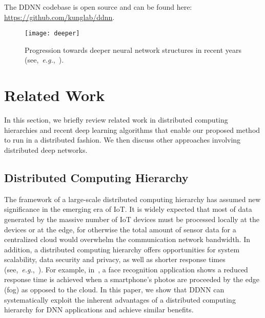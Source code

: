 \documentclass[10pt, conference, compsocconf]{IEEEtran}
\newcommand{\eg}{\emph{e.g.}}
\begin{document}
The DDNN codebase is open source and can be found here: \url{https://github.com/kunglab/ddnn}.


\begin{figure}
    \centering
    \texttt{[image: deeper]}
    \caption{Progression towards deeper neural network structures in recent years (see,~\eg,~\cite{lecun1998gradient,krizhevsky2012imagenet,simonyan2014very,szegedy2015going,he2015deep}).}
    \label{fig:deeper}
\end{figure}
 

\section{Related Work}
In this section, we briefly review related work in distributed computing hierarchies and recent deep learning algorithms that enable our proposed method to run in a distributed fashion. We then discuss other approaches involving distributed deep networks.  

\subsection{Distributed Computing Hierarchy}
The framework of a large-scale distributed computing hierarchy has assumed new significance in the emerging era of IoT. It is widely expected that most of data generated by the massive number of IoT devices must be processed locally at the devices or at the edge, for otherwise the total amount of sensor data for a centralized cloud would overwhelm the communication network bandwidth. In addition, a distributed computing hierarchy offers opportunities for system scalability, data security and privacy, as well as shorter response times (see,~\eg,~\cite{skala2015scalable, yi2015fog}). For example, in~\cite{yi2015fog}, a face recognition application shows a reduced response time is achieved when a smartphone's photos are proceeded by the edge (fog) as opposed to the cloud. In this paper, we show that DDNN can systematically exploit the inherent advantages of a distributed computing hierarchy for DNN applications and achieve similar benefits.
\end{document}
